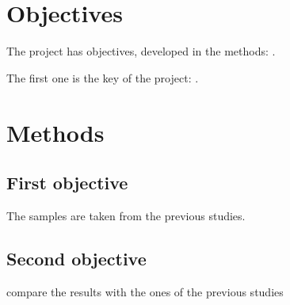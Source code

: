 \documentclass{article}
\begin{document}
\section{Objectives}
The project has  objectives, developed in the
methods: .

The first one is the key of the project: .

\section{Methods}
\subsection{First objective}

The samples are taken from the previous studies.

\subsection{Second objective}
\begin{scontents}[store-env=objectives, print-env]
compare the results with the ones of the previous studies
\end{scontents}
\end{document}
